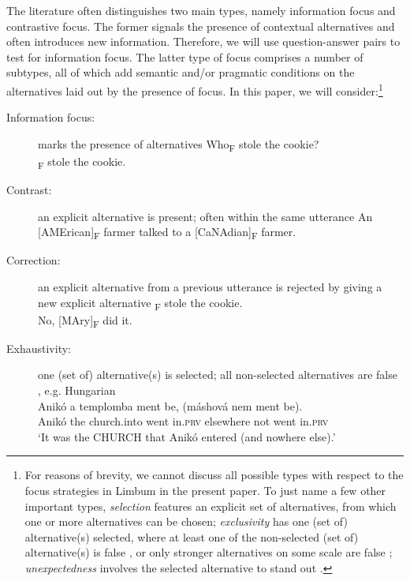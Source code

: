 \documentclass[output=paper,
modfonts
]{langscibook}
\begin{document}
The literature often distinguishes two main types, namely information focus and contrastive focus. The former signals the presence of contextual alternatives and often introduces new information. Therefore, we will use question-answer pairs to test for information focus. The latter type of focus comprises a number of subtypes, all of which add semantic and/or pragmatic conditions on the alternatives laid out by the presence of focus. In this paper, we will consider:\footnote{For reasons of brevity, we cannot discuss all possible types with respect to the focus strategies in Limbum in the present paper. To just name a few other important types, \textit{selection} features an explicit set of alternatives, from which one or more alternatives can be chosen; \textit{exclusivity} has one (set of) alternative(s) selected, where at least one of the non-selected (set of) alternative(s) is false \citep{vanderWal2011,vanderWal2014}, or only stronger alternatives on some scale are false \citep{Beaver2008,Coppock2012}; \textit{unexpectedness} involves the selected alternative to stand out \citep{Zimmermann2008,Zimmermann2011a,Hartmann2008,Skopeteas2009,Skopeteas2011,Frey2010,Zimmermann2011a,Destruel2014}. }
\begin{description}
\item[Information focus:] marks the presence of alternatives
\ea Who\textsubscript{F} stole the cookie?\\ \relax[PEter]\textsubscript{F} stole the cookie. \z
\item[Contrast:] an explicit alternative is present; often within the same utterance
\ea An [AMErican]\textsubscript{F} farmer talked to a [CaNAdian]\textsubscript{F} farmer. \z
\item[Correction:] an explicit alternative from a previous utterance is rejected by giving a new explicit alternative
\ea \relax[PEter]\textsubscript{F} stole the cookie.\\ No, [MAry]\textsubscript{F} did it.\z
\item[Exhaustivity:] one (set of) alternative(s) is selected; all non-selected alternatives are false \citep{Szabolcsi1981,Kiss1998,Vallduvi1998,Horvath2010,Horvath2013}, e.g.
\ea
Hungarian\\
\gll Anikó a templomba ment be, (máshová nem ment be).\\
Anikó the church.into went in.\textsc{prv} elsewhere not went in.\textsc{prv}\\
\glt `It was the CHURCH that Anikó entered (and nowhere else).'
\z 
\end{description}
\end{document}
